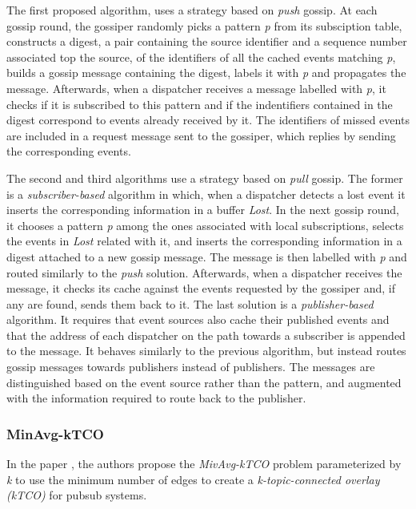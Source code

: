 The first proposed algorithm, uses a strategy based on \textit{push} gossip. At each gossip round, the gossiper randomly picks a pattern \textit{p} from its subsciption table, constructs a digest, a pair containing the source identifier and a sequence number associated top the source, of the identifiers of all the cached events matching \textit{p}, builds a gossip message containing the digest, labels it with \textit{p} and propagates the message. Afterwards, when a dispatcher receives a message labelled with \textit{p}, it checks if it is subscribed to this pattern and if the indentifiers contained in the digest correspond to events already received by it. The identifiers of missed events are included in a request message sent to the gossiper, which replies by sending the corresponding events.

The second and third algorithms use a strategy based on \textit{pull} gossip. The former is a \textit{subscriber-based} algorithm in which, when a dispatcher detects a lost event it inserts the corresponding information in a buffer \textit{Lost}. In the next gossip round, it chooses a pattern \textit{p} among the ones associated with local subscriptions, selects the events in \textit{Lost} related with it, and inserts the corresponding information in a digest attached to a new gossip message. The message is then labelled with \textit{p} and routed similarly to the \textit{push} solution. Afterwards, when a dispatcher receives the message, it checks its  cache against the events requested by the gossiper and, if any are found, sends them back to it. The last solution is a \textit{publisher-based} algorithm. It requires that event sources also cache their published events and that the address of each dispatcher on the path towards a subscriber is appended to the message. It behaves similarly to the previous algorithm, but instead routes gossip messages towards publishers instead of publishers. The messages are distinguished based on the event source rather than the pattern, and augmented with the information required to route back to the publisher.


\subsubsection{MinAvg-kTCO}

In the paper \cite{minavg-k-tco}, the authors propose the \textit{MivAvg-kTCO} problem parameterized by \textit{k} to use the minimum number of edges to create a \textit{k-topic-connected overlay ({kTCO})} for \gls{pubsub} systems.

